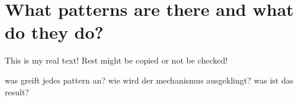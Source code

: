 \section{What patterns are there and what do they do?} \label{section:luckypatcher-patterns}
This is my real text! Rest might be copied or not be checked!



was greift jedes pattern an? wie wird der mechanismus ausgeklingt? was ist das result?
